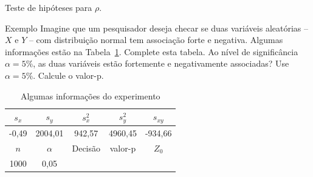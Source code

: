 \documentclass[9pt]{beamer}
\begin{document}
\begin{frame}{Teste de hipóteses para $\rho$.}

\begin{block}{Exemplo}
	Imagine que um pesquisador deseja checar se duas variáveis aleatórias -- $X$ e $Y$ -- com distribuição normal tem associação forte e negativa. Algumas informações estão na Tabela~\ref{tab:experimento-test-rho}. Complete esta tabela. Ao nível de significância $\alpha=5\%$, as duas variáveis estão fortemente e negativamente associadas? Use $\alpha=5\%$. Calcule o valor-p.
	
	\begin{table}[ht]
		\centering
		\begin{tabular}{c|c|c|c|c}
			\toprule[0.05cm]
			$s_x$ & $s_y$ & $s_x^2$ & $s_y^2$ & $s_{xy}$\\
			\midrule
			-0,49 & 2004,01 & 942,57 & 4960,45 & -934,66  \\ \midrule[0.05cm]
			  $n$ & $\alpha$ & Decisão & valor-p & $Z_0$ \\ \midrule
			  1000 & 0,05 &  &  &  \\ \bottomrule[0.05cm]
		\end{tabular}
		\caption{Algumas informações do experimento} 
		\label{tab:experimento-test-rho}
	\end{table}
\end{block}

\end{frame}
\end{document}
